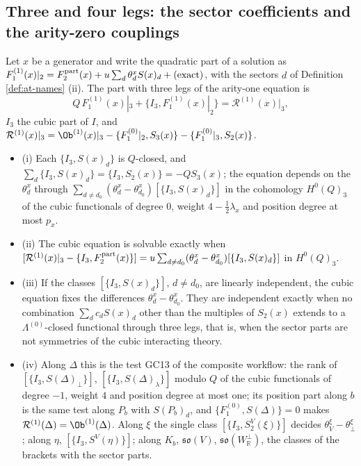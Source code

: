 \subsection{Three and four legs: the sector coefficients and the arity-zero couplings}

\begin{theorem}
\label{thm:at-cubic}
Let $x$ be a generator and write the quadratic part of a solution as $F_1^{(1)}(x)|_2=F^{\rm part}_2(x)+u\sum_d\theta^x_dS(x)_d+(\text{exact})$, with the sectors $d$ of Definition \ref{def:at-names} (ii). The part with three legs of the arity-one equation is
\[
Q\,F_1^{(1)}(x)|_3+\{I_3,F_1^{(1)}(x)|_2\}=\mathcal R^{(1)}(x)|_3,
\]
$I_3$ the cubic part of $I$, and $\mathcal R^{(1)}(x)|_3=\Ob^{(1)}(x)|_3-\{F_1^{(0)}|_2,S_3(x)\}-\{F_1^{(0)}|_3,S_2(x)\}$.
\begin{itemize}
\item (i) Each $\{I_3,S(x)_d\}$ is $Q$-closed, and $\sum_d\{I_3,S(x)_d\}=\{I_3,S_2(x)\}=-QS_3(x)$; the equation depends on the $\theta^x_d$ through $\sum_{d\ne d_0}(\theta^x_d-\theta^x_{d_0})[\{I_3,S(x)_d\}]$ in the cohomology $H^0(Q)_3$ of the cubic functionals of degree $0$, weight $4-\tfrac12\lambda_x$ and position degree at most $p_x$.
\item (ii) The cubic equation is solvable exactly when $[\mathcal R^{(1)}(x)|_3-\{I_3,F^{\rm part}_2(x)\}]=u\sum_{d\ne d_0}(\theta^x_d-\theta^x_{d_0})[\{I_3,S(x)_d\}]$ in $H^0(Q)_3$.
\item (iii) If the classes $[\{I_3,S(x)_d\}]$, $d\ne d_0$, are linearly independent, the cubic equation fixes the differences $\theta^x_d-\theta^x_{d_0}$. They are independent exactly when no combination $\sum_dc_dS(x)_d$ other than the multiples of $S_2(x)$ extends to a $\Lambda^{(0)}$-closed functional through three legs, that is, when the sector parts are not symmetries of the cubic interacting theory.
\item (iv) Along $\Delta$ this is the test GC13 of the composite workflow: the rank of $[\{I_3,S(\Delta)_\perp\}]$, $[\{I_3,S(\Delta)_\lambda\}]$ modulo $Q$ of the cubic functionals of degree $-1$, weight $4$ and position degree at most one; its position part along $b$ is the same test along $P_b$ with $S(P_b)_d$, and $\{F_1^{(0)},S(\Delta)\}=0$ makes $\mathcal R^{(1)}(\Delta)=\Ob^{(1)}(\Delta)$. Along $\xi$ the single class $[\{I_3,S^V_2(\xi)\}]$ decides $\theta^\xi_V-\theta^\xi_\perp$; along $\eta$, $[\{I_3,S^V(\eta)\}]$; along $K_b$, $\mathfrak{so}(V)$, $\mathfrak{so}(W^\perp_{\mathbb R})$, the classes of the brackets with the sector parts.
\end{itemize}
\end{theorem}


